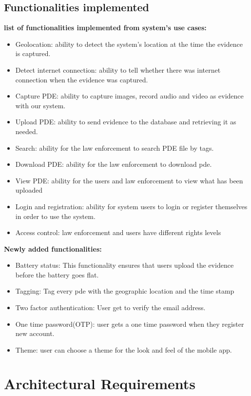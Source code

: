 \documentclass[a4paper,12pt]{article}
\begin{document}
\subsection{Functionalities implemented}
\textbf{list of functionalities implemented from system's use cases:}
\begin{itemize}
	\item Geolocation: ability to detect the system's location at the time the evidence is captured.
	\item Detect internet connection: ability to tell whether there was internet connection when the evidence was captured.
	\item Capture PDE: ability to capture images, record audio and video as evidence with our system.
	\item Upload PDE: ability to send evidence to the database and retrieving it as needed.
	\item Search: ability for the law enforcement to search PDE file by tags.
	\item Download PDE: ability for the law enforcement to download pde.
	\item View PDE: ability for the users and law enforcement to view what has been uploaded
	\item Login and registration: ability for system users to login or register themselves in order to use the system.
	\item Access control: law enforcement and users have different rights levels

\end{itemize}

\textbf{Newly added functionalities:}
\begin{itemize}
	\item Battery status: This functionality ensures that users upload the evidence before the battery goes flat.
	\item Tagging: Tag every pde with the geographic location and the time stamp
	\item Two factor authentication: User get to verify the email address.
	\item One time password(OTP): user gets a one time password when they register new account.
	\item Theme: user can choose a theme for the look and feel of the mobile app.
\end{itemize}

\section{Architectural Requirements}
\end{document}
